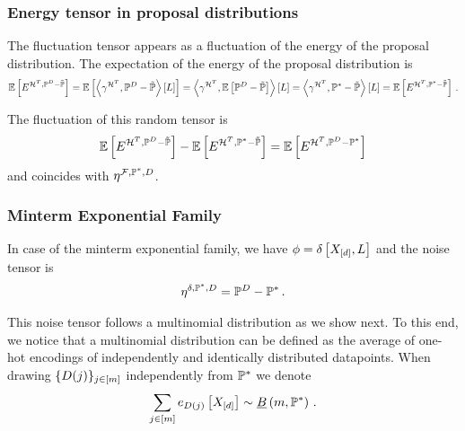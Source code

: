 \subsubsection{Energy tensor in proposal distributions}

The fluctuation tensor appears as a fluctuation of the energy of the proposal distribution.
The expectation of the energy of the proposal distribution is
\begin{align*}
    \mathbb{E}\left[E^{\mathcal{H}^T,\mathbb{P}^{D}-\tilde{\mathbb{P}}}\right]
    = \mathbb{E}\left[\left\langle \gamma^{\mathcal{H}^T},\mathbb{P}^{D}-\tilde{\mathbb{P}}\right\rangle \left[ L \right]\right]
    = \left\langle \gamma^{\mathcal{H}^T},\mathbb{E}\left[\mathbb{P}^{D}-\tilde{\mathbb{P}}\right]\right\rangle \left[ L \right]
    = \left\langle \gamma^{\mathcal{H}^T},\mathbb{P}^*-\tilde{\mathbb{P}}\right\rangle \left[ L \right]
    = \mathbb{E}\left[E^{\mathcal{H}^T,\mathbb{P}^*-\tilde{\mathbb{P}}}\right] \, .
\end{align*}

The fluctuation of this random tensor is
\begin{align*}
    \mathbb{E}\left[E^{\mathcal{H}^T,\mathbb{P}^{D}-\tilde{\mathbb{P}}}\right]  - \mathbb{E}\left[E^{\mathcal{H}^T,\mathbb{P}^*-\tilde{\mathbb{P}}}\right]
    = \mathbb{E}\left[E^{\mathcal{H}^T,\mathbb{P}^{D}-\mathbb{P}^*}\right]
\end{align*}
and coincides with $\eta^{\mathcal{F},\mathbb{P}^*,D}$.

\subsubsection{Minterm Exponential Family} %


In case of the minterm exponential family, we have $\phi=\delta\left[X_{[d]},L\right]$ and the noise tensor is
\begin{align*}
    \eta^{\delta,\mathbb{P}^*,D} = \mathbb{P}^{D} - \mathbb{P}^* \, .
\end{align*}

This noise tensor follows a multinomial distribution as we show next.
To this end, we notice that a multinomial distribution can be defined as the average of one-hot encodings of independently and identically distributed datapoints.
When drawing $\{D(j)\}_{j\in[m]}$ independently from $\mathbb{P}^*$ we denote
\begin{align*}
    \sum_{j\in[m]}e_{D(j)}\left[X_{[d]}\right]
    \sim \underline{B}\left(m,\mathbb{P}^*\right) \, .
\end{align*}


